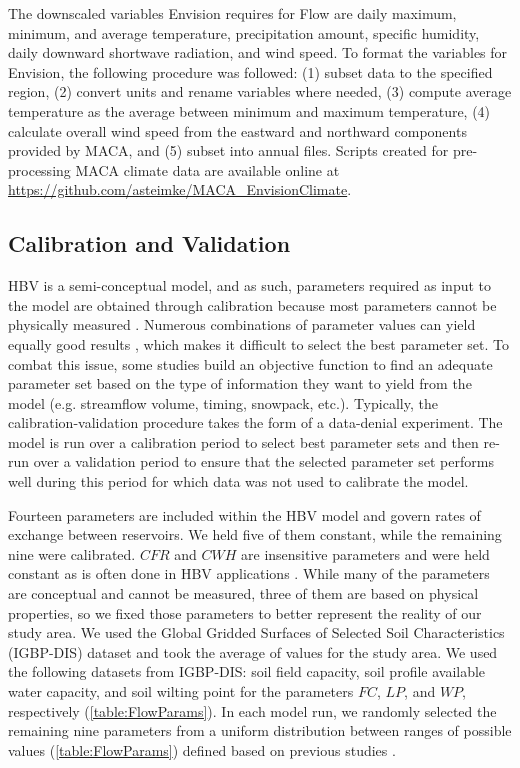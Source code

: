 \documentclass[water,article,submit,moreauthors,pdftex,10pt,a4paper]{mdpi}
\theoremstyle{mdpi}
\newcounter{ex}
\newcounter{re}
\theoremstyle{mdpidefinition}
\begin{document}
The downscaled variables Envision requires for Flow are daily maximum, minimum, and average temperature, precipitation amount, specific humidity, daily downward shortwave radiation, and wind speed. To format the variables for Envision, the following procedure was followed: (1) subset data to the specified region, (2) convert units and rename variables where needed, (3) compute average temperature as the average between minimum and maximum temperature, (4) calculate overall wind speed from the eastward and northward components provided by MACA, and (5) subset into annual files. Scripts created for pre-processing MACA climate data are available online at \href{https://github.com/asteimke/MACA\_EnvisionClimate}{https://github.com/asteimke/MACA\_EnvisionClimate}.

\subsection{Calibration and Validation}

HBV is a semi-conceptual model, and as such, parameters required as input to the model are obtained through calibration because most parameters cannot be physically measured \citep{Bergstrom:2015ck}. Numerous combinations of parameter values can yield equally good results \citep[i.e. the equifinality issue,][]{Beven:2006wa,Gupta:2005wl}, which makes it difficult to select the best parameter set. To combat this issue, some studies \citep{Madsen:2003un,Inouye:2014ws} build an objective function to find an adequate parameter set based on the type of information they want to yield from the model (e.g. streamflow volume, timing, snowpack, etc.). Typically, the calibration-validation procedure takes the form of a data-denial experiment. The model is run over a calibration period to select best parameter sets and then re-run over a validation period to ensure that the selected parameter set performs well during this period for which data was not used to calibrate the model.

Fourteen parameters are included within the HBV model and govern rates of exchange between reservoirs. We held five of them constant, while the remaining nine were calibrated. $CFR$ and $CWH$ are insensitive parameters and were held constant as is often done in HBV applications \citep{Seibert:1997vw}. While many of the parameters are conceptual and cannot be measured, three of them are based on physical properties, so we fixed those parameters to better represent the reality of our study area. We used the Global Gridded Surfaces of Selected Soil Characteristics (IGBP-DIS) dataset \citep{Hope:1994wq} and took the average of values for the study area. We used the following datasets from IGBP-DIS: soil field capacity, soil profile available water capacity, and soil wilting point for the parameters $FC$, $LP$, and $WP$, respectively (\cref{table:FlowParams}). In each model run, we randomly selected the remaining nine parameters from a uniform distribution between ranges of possible values (\cref{table:FlowParams}) defined based on previous studies \citep{Inouye:2014ws,Han:2017tx}. 
\end{document}
